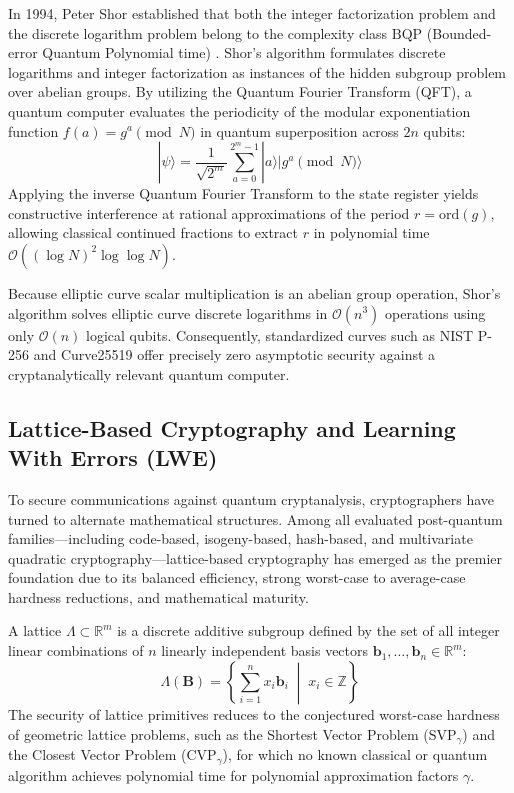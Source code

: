 In 1994, Peter Shor established that both the integer factorization problem and the discrete logarithm problem belong to the complexity class $\text{BQP}$ (Bounded-error Quantum Polynomial time) \cite{shor1994algorithms}. Shor's algorithm formulates discrete logarithms and integer factorization as instances of the hidden subgroup problem over abelian groups. By utilizing the Quantum Fourier Transform (QFT), a quantum computer evaluates the periodicity of the modular exponentiation function $f(a) = g^a \pmod N$ in quantum superposition across $2n$ qubits:
\begin{equation}
    |\psi\rangle = \frac{1}{\sqrt{2^m}} \sum_{a=0}^{2^m - 1} |a\rangle |g^a \pmod N\rangle
\end{equation}
Applying the inverse Quantum Fourier Transform to the state register yields constructive interference at rational approximations of the period $r = \text{ord}(g)$, allowing classical continued fractions to extract $r$ in polynomial time $\mathcal{O}((\log N)^2 \log \log N)$. 

Because elliptic curve scalar multiplication is an abelian group operation, Shor's algorithm solves elliptic curve discrete logarithms in $\mathcal{O}(n^3)$ operations using only $\mathcal{O}(n)$ logical qubits. Consequently, standardized curves such as NIST P-256 and Curve25519 offer precisely zero asymptotic security against a cryptanalytically relevant quantum computer.

\subsection{Lattice-Based Cryptography and Learning With Errors (LWE)}
To secure communications against quantum cryptanalysis, cryptographers have turned to alternate mathematical structures. Among all evaluated post-quantum families—including code-based, isogeny-based, hash-based, and multivariate quadratic cryptography—lattice-based cryptography has emerged as the premier foundation due to its balanced efficiency, strong worst-case to average-case hardness reductions, and mathematical maturity.

A lattice $\Lambda \subset \mathbb{R}^m$ is a discrete additive subgroup defined by the set of all integer linear combinations of $n$ linearly independent basis vectors $\mathbf{b}_1, \dots, \mathbf{b}_n \in \mathbb{R}^m$:
\begin{equation}
    \Lambda(\mathbf{B}) = \left\{ \sum_{i=1}^n x_i \mathbf{b}_i \;\middle|\; x_i \in \mathbb{Z} \right\}
\end{equation}
The security of lattice primitives reduces to the conjectured worst-case hardness of geometric lattice problems, such as the Shortest Vector Problem ($\text{SVP}_\gamma$) and the Closest Vector Problem ($\text{CVP}_\gamma$), for which no known classical or quantum algorithm achieves polynomial time for polynomial approximation factors $\gamma$.

